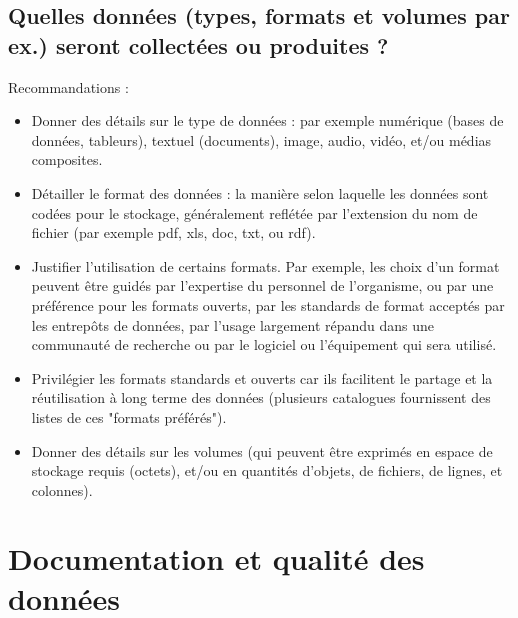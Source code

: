\documentclass{article}
\begin{document}
\subsection{Quelles données (types, formats et volumes par ex.) seront collectées ou produites ?}
Recommandations :
\begin{itemize}
    \item Donner des détails sur le type de données : par exemple numérique (bases de données, tableurs), textuel (documents), image, audio, vidéo, et/ou médias composites.
    \item Détailler le format des données : la manière selon laquelle les données sont codées pour le stockage, généralement reflétée par l'extension du nom de fichier (par exemple pdf, xls, doc, txt, ou rdf).
    \item Justifier l'utilisation de certains formats. Par exemple, les choix d’un format peuvent être guidés par l’expertise du personnel de l'organisme, ou par une préférence pour les formats ouverts, par les standards de format acceptés par les entrepôts de données, par l’usage largement répandu dans une communauté de recherche ou par le logiciel ou l'équipement qui sera utilisé.
    \item Privilégier les formats standards et ouverts car ils facilitent le partage et la réutilisation à long terme des données (plusieurs catalogues fournissent des listes de ces "formats préférés").
    \item Donner des détails sur les volumes (qui peuvent être exprimés en espace de stockage requis (octets), et/ou en quantités d'objets, de fichiers, de lignes, et colonnes).
\end{itemize}

\section{Documentation et qualité des données}
\end{document}
